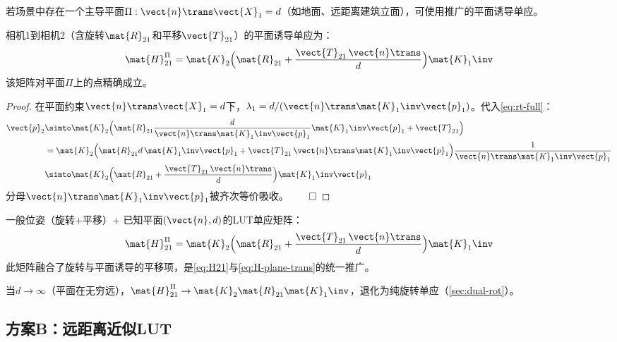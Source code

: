 若场景中存在一个主导平面$\Pi: \vect{n}\trans\vect{X}_1 = d$（如地面、远距离建筑立面），可使用推广的平面诱导单应。

\begin{theorem}[一般平面诱导单应]
相机1到相机2（含旋转$\mat{R}_{21}$和平移$\vect{T}_{21}$）的平面诱导单应为：
\begin{equation}
\mat{H}_{21}^{\Pi} = \mat{K}_2\Bigl(\mat{R}_{21} + \frac{\vect{T}_{21}\,\vect{n}\trans}{d}\Bigr)\mat{K}_1\inv
\label{eq:H-plane-general}
\end{equation}
该矩阵对平面$\Pi$上的点精确成立。
\end{theorem}

\begin{proof}
在平面约束$\vect{n}\trans\vect{X}_1 = d$下，$\lambda_1 = d/(\vect{n}\trans\mat{K}_1\inv\vect{p}_1)$。代入\eqref{eq:rt-full}：
\begin{align*}
\vect{p}_2 &\simto \mat{K}_2\Bigl(\mat{R}_{21}\frac{d}{\vect{n}\trans\mat{K}_1\inv\vect{p}_1}\mat{K}_1\inv\vect{p}_1 + \vect{T}_{21}\Bigr) \\
           &= \mat{K}_2\Bigl(\mat{R}_{21}d\,\mat{K}_1\inv\vect{p}_1 + \vect{T}_{21}\,\vect{n}\trans\mat{K}_1\inv\vect{p}_1\Bigr)\frac{1}{\vect{n}\trans\mat{K}_1\inv\vect{p}_1} \\
           &\simto \mat{K}_2\Bigl(\mat{R}_{21} + \frac{\vect{T}_{21}\,\vect{n}\trans}{d}\Bigr)\mat{K}_1\inv\vect{p}_1
\end{align*}
分母$\vect{n}\trans\mat{K}_1\inv\vect{p}_1$被齐次等价吸收。$\qed$
\end{proof}

\begin{finalbox}
一般位姿（旋转+平移）+ 已知平面$(\vect{n}, d)$的LUT单应矩阵：
\[
\mat{H}_{21}^{\Pi} = \mat{K}_2\Bigl(\mat{R}_{21} + \frac{\vect{T}_{21}\,\vect{n}\trans}{d}\Bigr)\mat{K}_1\inv
\]
此矩阵融合了旋转与平面诱导的平移项，是\cref{eq:H21}与\eqref{eq:H-plane-trans}的统一推广。
\end{finalbox}

\begin{remark}
当$d \to \infty$（平面在无穷远），$\mat{H}_{21}^{\Pi} \to \mat{K}_2\mat{R}_{21}\mat{K}_1\inv$，退化为纯旋转单应（\cref{sec:dual-rot}）。
\end{remark}

\subsection{方案B：远距离近似LUT}
\label{sec:rt-distant}

